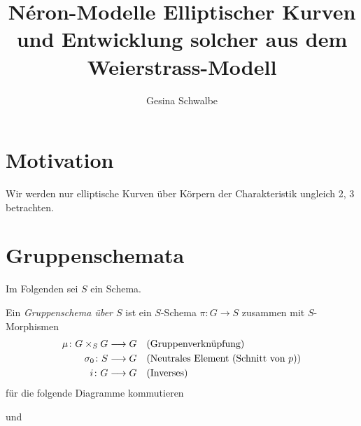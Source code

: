 \documentclass[german]{scrreprt}
\title{Néron-Modelle Elliptischer Kurven 
  und Entwicklung solcher aus dem Weierstrass-Modell}
\author{Gesina Schwalbe}
\begin{document}
\maketitle
\tableofcontents

\chapter{Motivation}
Wir werden nur elliptische Kurven über Körpern der Charakteristik
ungleich 2, 3 betrachten.


\chapter{Gruppenschemata}
Im Folgenden sei $S$ ein Schema.
\begin{Definition}[$S$"=Gruppenschema]
  Ein \emph{Gruppenschema über $S$} ist ein
  $S$-Schema $\pi\colon G\to S$ zusammen mit $S$-Morphismen
  \begin{align*}
    \mu\colon G\times_S G &\longrightarrow G
    &&\text{(Gruppenverknüpfung)}\\
    \sigma_0\colon S&\longrightarrow G 
    &&\text{(Neutrales Element (Schnitt von $p$))}\\
    i\colon G &\longrightarrow G    
    &&\text{(Inverses)}
  \end{align*}
  für die folgende Diagramme kommutieren
  \begin{description}[labelwidth=4cm]
  \item[Neutrales Element]
    und
  \item[Inverses]

\end{description}
\end{Definition}
\end{document}
